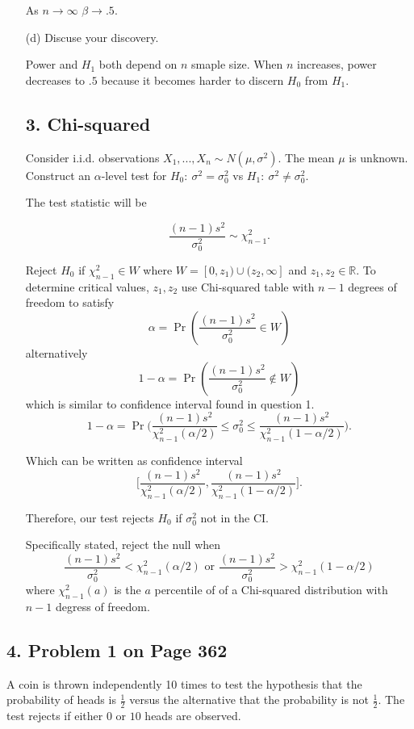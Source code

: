 \documentclass{tufte-book}
\begin{document}
\begin{enumerate}
As $n \rightarrow \infty$ $\beta \rightarrow .5$.

\item[(d)] Discuse your discovery.

Power and $H_1$ both depend on $n$ smaple size.  When $n$ increases, power decreases to $.5$ because it becomes harder to discern $H_0$ from $H_1$.

\subsection{3. Chi-squared}
Consider i.i.d. observations $X_1,...,X_n \sim N(\mu, \sigma^2)$.  The mean $\mu$ is unknown.  Construct an $\alpha$-level test for $H_0: \ \sigma^2=\sigma_0^2$ vs $H_1: \ \sigma^2 \neq \sigma_0^2$.

The test statistic will be

\[ \frac{(n-1)s^2}{\sigma^2_0} \sim \chi_{n-1}^2. \]

Reject $H_0$ if $\chi_{n-1}^2 \in W$ where $W=[0, z_1) \cup (z_2, \infty]$ and $z_1,z_2 \in \mathbb{R}$.  To determine critical values, $z_1,z_2$ use Chi-squared table with $n-1$ degrees of freedom to satisfy
\[ \alpha = \Pr(\frac{(n-1)s^2}{\sigma^2_0} \in W) \]
alternatively
\[ 1-\alpha = \Pr(\frac{(n-1)s^2}{\sigma^2_0} \not\in W) \]
which is similar to confidence interval found in question 1.
\[ 1-\alpha = \Pr\big( \frac{(n-1)s^2}{\chi_{n-1}^2(\alpha/2)} \leq \sigma_0^2 \leq \frac{(n-1)s^2}{\chi_{n-1}^2(1-\alpha/2)}\big). \]

Which can be written as confidence interval
\[  \big[\frac{(n-1)s^2}{\chi_{n-1}^2(\alpha/2)},  \frac{(n-1)s^2}{\chi_{n-1}^2(1-\alpha/2)} \big]. \]

Therefore, our test rejects $H_0$ if $\sigma_0^2$ not in the CI.

Specifically stated, reject the null when
\[ \frac{(n-1)s^2}{\sigma_0^2} < \chi_{n-1}^2(\alpha/2) \text{ or } \frac{(n-1)s^2}{\sigma_0^2} > \chi_{n-1}^2(1-\alpha/2) \]
where $\chi_{n-1}^2(a)$ is the $a$ percentile of of a Chi-squared distribution with $n-1$ degress of freedom.
\end{enumerate}

\subsection{4. Problem 1 on Page 362}
A coin is thrown independently 10 times to test the hypothesis that the probability of heads is $\frac{1}{2}$ versus the alternative that the probability is not $\frac{1}{2}$.  The test rejects if either $0$ or $10$ heads are observed.
\end{document}
